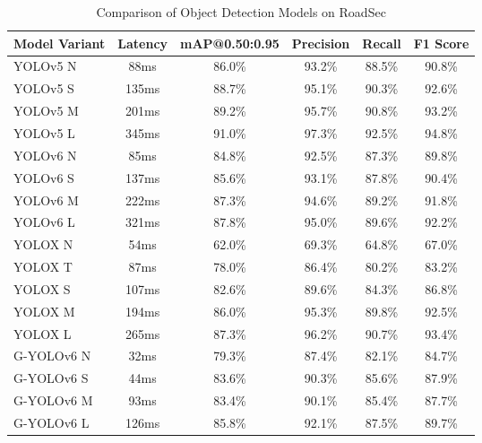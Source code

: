 \begin{table}[htbp]
    \centering
    \caption{Comparison of Object Detection Models on RoadSec}
    \label{tab:roadsec_model_comparison}
    \begin{tabularx}{\textwidth}{@{}Xccccc@{}}
    \toprule
    Model Variant & Latency & mAP@0.50:0.95 & Precision & Recall & F1 Score \\ 
    \midrule
    \cite{ultralytics2021yolov5}YOLOv5 N & 88ms & 86.0\% & 93.2\% & 88.5\% & 90.8\% \\
    \cite{ultralytics2021yolov5}YOLOv5 S & 135ms & 88.7\% & 95.1\% & 90.3\% & 92.6\% \\
    \cite{ultralytics2021yolov5}YOLOv5 M & 201ms & 89.2\% & 95.7\% & 90.8\% & 93.2\% \\
    \cite{ultralytics2021yolov5}YOLOv5 L & 345ms & 91.0\% & 97.3\% & 92.5\% & 94.8\% \\
    \addlinespace
    \cite{li2023yolov6}YOLOv6 N & 85ms & 84.8\% & 92.5\% & 87.3\% & 89.8\% \\
    \cite{li2023yolov6}YOLOv6 S & 137ms & 85.6\% & 93.1\% & 87.8\% & 90.4\% \\
    \cite{li2023yolov6}YOLOv6 M & 222ms & 87.3\% & 94.6\% & 89.2\% & 91.8\% \\
    \cite{li2023yolov6}YOLOv6 L & 321ms & 87.8\% & 95.0\% & 89.6\% & 92.2\% \\
    \addlinespace
    \cite{ge2021yolox}YOLOX N & 54ms & 62.0\% & 69.3\% & 64.8\% & 67.0\% \\
    \cite{ge2021yolox}YOLOX T & 87ms & 78.0\% & 86.4\% & 80.2\% & 83.2\% \\
    \cite{ge2021yolox}YOLOX S & 107ms & 82.6\% & 89.6\% & 84.3\% & 86.8\% \\
    \cite{ge2021yolox}YOLOX M & 194ms & 86.0\% & 95.3\% & 89.8\% & 92.5\% \\
    \cite{ge2021yolox}YOLOX L & 265ms & 87.3\% & 96.2\% & 90.7\% & 93.4\% \\
    \addlinespace
    G-YOLOv6 N & 32ms & 79.3\% & 87.4\% & 82.1\% & 84.7\% \\
    G-YOLOv6 S & 44ms & 83.6\% & 90.3\% & 85.6\% & 87.9\% \\
    G-YOLOv6 M & 93ms & 83.4\% & 90.1\% & 85.4\% & 87.7\% \\
    G-YOLOv6 L & 126ms & 85.8\% & 92.1\% & 87.5\% & 89.7\% \\
    \bottomrule
    \end{tabularx}
\end{table}

